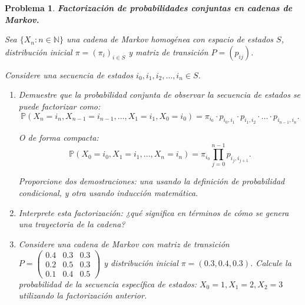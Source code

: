 \documentclass[12pt]{article}
\newtheorem{problem}{Problema}
\begin{document}
\begin{problem}
\textbf{Factorización de probabilidades conjuntas en cadenas de Markov.}

Sea $\{X_n : n \in \mathbb{N}\}$ una cadena de Markov homogénea con espacio de estados $S$, distribución inicial $\pi = (\pi_i)_{i \in S}$ y matriz de transición $P = (p_{ij})$.

Considere una secuencia de estados $i_0, i_1, i_2, \ldots, i_n \in S$.

\begin{enumerate}
    \item[(a)] Demuestre que la probabilidad conjunta de observar la secuencia de estados se puede factorizar como:
    \[
    \mathbb{P}(X_n = i_n, X_{n-1} = i_{n-1}, \ldots, X_1 = i_1, X_0 = i_0) = \pi_{i_0} \cdot p_{i_0, i_1} \cdot p_{i_1, i_2} \cdot \ldots \cdot p_{i_{n-1}, i_n}.
    \]
    
    O de forma compacta:
    \[
    \mathbb{P}(X_0 = i_0, X_1 = i_1, \ldots, X_n = i_n) = \pi_{i_0} \prod_{j=0}^{n-1} p_{i_j, i_{j+1}}.
    \]
    
    Proporcione dos demostraciones: una usando la definición de probabilidad condicional, y otra usando inducción matemática.
    
    \item[(b)] Interprete esta factorización: ¿qué significa en términos de cómo se genera una trayectoria de la cadena?
    
    \item[(c)] Considere una cadena de Markov con matriz de transición $P = \begin{pmatrix} 0.4 & 0.3 & 0.3 \\ 0.2 & 0.5 & 0.3 \\ 0.1 & 0.4 & 0.5 \end{pmatrix}$ y distribución inicial $\pi = (0.3, 0.4, 0.3)$. Calcule la probabilidad de la secuencia específica de estados: $X_0 = 1, X_1 = 2, X_2 = 3$ utilizando la factorización anterior.

\end{enumerate}
\end{problem}
\end{document}
